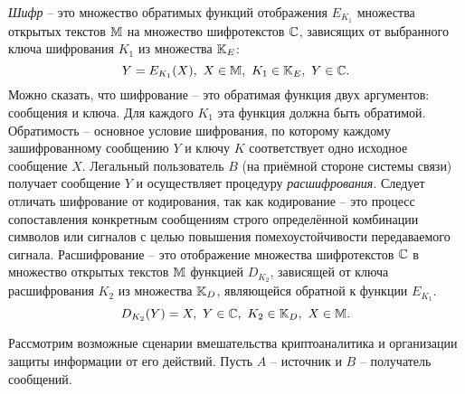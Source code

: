 \emph{Шифр} -- это множество обратимых функций отображения $E_{K_1}$ множества открытых текстов $\mathbb{M}$ на множество шифротекстов $\mathbb{C}$, зависящих от выбранного ключа шифрования $K_1$ из множества $\mathbb{K}_E$:
\begin{equation}
    \label{eq:Encryption}
    Y = E_{K_1}(X), ~ X \in \mathbb{M}, ~ K_1 \in \mathbb{K}_E, ~ Y \in \mathbb{C}.
\end{equation}
Можно сказать, что шифрование -- это обратимая функция двух аргументов: сообщения и ключа. Для каждого $K_1$ эта функция должна быть обратимой. Обратимость -- основное условие шифрования, по которому каждому зашифрованному сообщению $Y$ и ключу $K$ соответствует одно исходное сообщение $X$. Легальный пользователь $B$ (на приёмной стороне системы связи) получает сообщение $Y$ и осуществляет процедуру \emph{расшифрования}.
Следует отличать шифрование от кодирования, так как кодирование -- это процесс сопоставления конкретным сообщениям строго определённой комбинации символов или сигналов с целью повышения помехоустойчивости передаваемого сигнала.
Расшифрование -- это отображение множества шифротекстов $\mathbb{C}$ в множество открытых текстов $\mathbb{M}$ функцией $D_{K_2}$, зависящей от ключа расшифрования $K_2$ из множества $\mathbb{K}_D$, являющейся обратной к функции $E_{K_1}$.
\begin{equation}
    \label{eq:Decryption}
    D_{K_2}(Y) = X, ~ Y \in \mathbb{C}, ~ K_2 \in \mathbb{K}_D, ~ X \in \mathbb{M}.
\end{equation}



Рассмотрим возможные сценарии вмешательства криптоаналитика и организации защиты информации от его действий.
Пусть $A$ -- источник и $B$ -- получатель сообщений.

